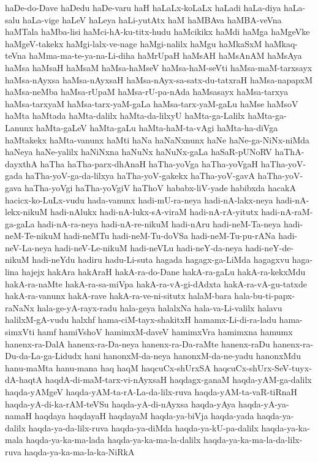 {haDe-do-Dave
haDedu
haDe-varu
haH
haLaLx-koLaLx
haLadi
haLa-diya
haLa-salu
haLa-vige
haLeV
haLeya
haLi-yutAtx
haM
haMBAva
haMBA-veVna
haMTala
haMba-lisi
haMci-hA-ku-titx-hudu
haMcikikx
haMdi
haMga
haMgeVke
haMgeV-takekx
haMgi-lalx-ve-nage
haMgi-nalilx
haMgu
haMkaSxM
haMkaq-teVna
haMma-ma-te-ya-na-Li-diha
haMrUpaH
haMsAH
haMsAnAM
haMsAya
haMsa
haMsaH
haMsaM
haMsa-haMseV
haMsa-haM-seVti
haMsa-maM-tarxsayx
haMsa-nAyxsa
haMsa-nAyxsaH
haMsa-nAyx-sa-satx-du-tatxraH
haMsa-napapxM
haMsa-neMba
haMsa-rUpaM
haMsa-rU-pa-nAda
haMsasayx
haMsa-tarxya
haMsa-tarxyaM
haMsa-tarx-yaM-gaLa
haMsa-tarx-yaM-gaLu
haMse
haMsoV
haMta
haMtada
haMta-dalilx
haMta-da-lilxyU
haMta-ga-Lalilx
haMta-ga-Lanunx
haMta-gaLeV
haMta-gaLu
haMta-haM-ta-vAgi
haMta-ha-diVga
haMtakekx
haMta-vanunx
haMti
haNa
haNaNxnunx
haNe
haNe-ga-NiNx-niMda
haNeya
haNe-yalilx
haNiNxna
haNuNx
haNuNx-gaLa
haSaR-pUNoRV
haThA-dayxthA
haTha
haTha-parx-dhAnaH
haTha-yoVga
haTha-yoVgaH
haTha-yoV-gada
haTha-yoV-ga-da-lilxya
haTha-yoV-gakekx
haTha-yoV-gavA
haTha-yoV-gava
haTha-yoVgi
haTha-yoVgiV
haThoV
hababx-liV-yade
habibxda
hacakA
hacicx-ko-LuLx-vudu
hada-vanunx
hadi-mU-ra-neya
hadi-nA-lakx-neya
hadi-nA-lekx-nikuM
hadi-nAlukx
hadi-nA-lukx-sA-viraM
hadi-nA-rA-yitutx
hadi-nA-raM-ga-gaLa
hadi-nA-ra-neya
hadi-nA-re-nikuM
hadi-nAru
hadi-neM-Ta-neya
hadi-neM-Te-nikuM
hadi-neMTu
hadi-neM-Tu-doVSa
hadi-neM-Tu-pu-rANa
hadi-neV-La-neya
hadi-neV-Le-nikuM
hadi-neVLu
hadi-neY-da-neya
hadi-neY-de-nikuM
hadi-neYdu
hadiru
hadu-Li-suta
hagada
hagagx-ga-LiMda
hagagxvu
haga-lina
hajejx
hakAra
hakAraH
hakA-ra-do-Dane
hakA-ra-gaLu
hakA-ra-kekxMdu
hakA-ra-naMte
hakA-ra-sa-miVpa
hakA-ra-vA-gi-dAdxta
hakA-ra-vA-gu-tatxde
hakA-ra-vanunx
hakA-rave
hakA-ra-ve-ni-situtx
halaM-bara
hala-bu-ti-papx-raNaNx
hala-ge-yA-rayx-radu
hala-geya
halalxNa
hala-va-Li-valilx
halavu
halilxM-gA-vudu
halxhf
hama-ciM-tayx-shakitxH
hamamx-Li-di-ra-ladu
hama-simxVti
hamf
hamiVshoV
hamimxM-daveV
hamimxVra
hamimxna
hamumx
hanenx-ra-DalA
hanenx-ra-Da-neya
hanenx-ra-Da-raMte
hanenx-raDu
hanenx-ra-Du-da-La-ga-Lidudx
hani
hanonxM-da-neya
hanonxM-da-ne-yadu
hanonxMdu
hanu-maMta
hanu-mana
haq
haqM
haqcuCx-shUrxSA
haqcuCx-shUrx-SeV-tuyx-dA-haqtA
haqdA-di-maM-tarx-vi-nAyxsaH
haqdagx-ganaM
haqda-yAM-ga-dalilx
haqda-yAMgeV
haqda-yAM-ta-rA-La-da-lilx-ruva
haqda-yAM-ta-vaR-tiRnaH
haqda-yA-di-ka-rAM-teVSu
haqda-yA-di-nAyxsa
haqda-yAya
haqda-yA-ya-namaH
haqdaya
haqdayaH
haqdayaM
haqda-ya-biVja
haqda-yada
haqda-ya-dalilx
haqda-ya-da-lilx-ruva
haqda-ya-diMda
haqda-ya-kU-pa-dalilx
haqda-ya-ka-mala
haqda-ya-ka-ma-lada
haqda-ya-ka-ma-la-dalilx
haqda-ya-ka-ma-la-da-lilx-ruva
haqda-ya-ka-ma-la-ka-NiRkA
}
